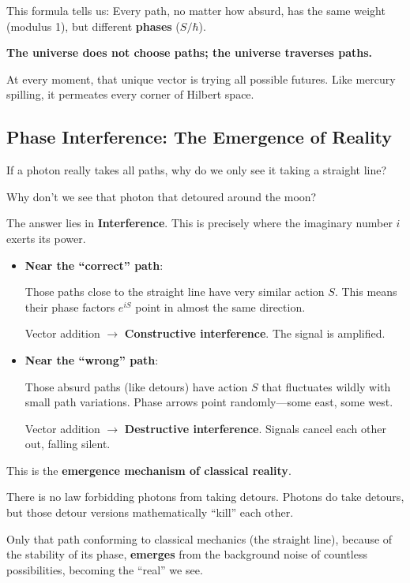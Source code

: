 This formula tells us: Every path, no matter how absurd, has the same weight (modulus 1), but different \textbf{phases} ($S/\hbar$).

\textbf{The universe does not choose paths; the universe traverses paths.}

At every moment, that unique vector is trying all possible futures. Like mercury spilling, it permeates every corner of Hilbert space.

\subsection{Phase Interference: The Emergence of Reality}

If a photon really takes all paths, why do we only see it taking a straight line?

Why don't we see that photon that detoured around the moon?

The answer lies in \textbf{Interference}. This is precisely where the imaginary number $i$ exerts its power.

\begin{itemize}
\item \textbf{Near the ``correct'' path}:

    Those paths close to the straight line have very similar action $S$. This means their phase factors $e^{iS}$ point in almost the same direction.

    Vector addition $\rightarrow$ \textbf{Constructive interference}. The signal is amplified.

\item \textbf{Near the ``wrong'' path}:

    Those absurd paths (like detours) have action $S$ that fluctuates wildly with small path variations. Phase arrows point randomly---some east, some west.

    Vector addition $\rightarrow$ \textbf{Destructive interference}. Signals cancel each other out, falling silent.
\end{itemize}

This is the \textbf{emergence mechanism of classical reality}.

There is no law forbidding photons from taking detours. Photons do take detours, but those detour versions mathematically ``kill'' each other.

Only that path conforming to classical mechanics (the straight line), because of the stability of its phase, \textbf{emerges} from the background noise of countless possibilities, becoming the ``real'' we see.

